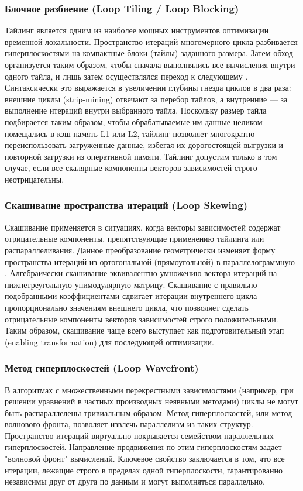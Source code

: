 \documentclass[14pt, russian]{scrartcl}
\begin{document}
\subsubsection{Блочное разбиение (Loop Tiling / Loop Blocking)}
Тайлинг является одним из наиболее мощных инструментов оптимизации временной локальности. Пространство итераций многомерного цикла разбивается гиперплоскостями на компактные блоки (тайлы) заданного размера. Затем обход организуется таким образом, чтобы сначала выполнялись все вычисления внутри одного тайла, и лишь затем осуществлялся переход к следующему \cite{wolfLam1991}. 
Синтаксически это выражается в увеличении глубины гнезда циклов в два раза: внешние циклы (strip-mining) отвечают за перебор тайлов, а внутренние --- за выполнение итераций внутри выбранного тайла. Поскольку размер тайла подбирается таким образом, чтобы обрабатываемые им данные целиком помещались в кэш-память L1 или L2, тайлинг позволяет многократно переиспользовать загруженные данные, избегая их дорогостоящей выгрузки и повторной загрузки из оперативной памяти. Тайлинг допустим только в том случае, если все скалярные компоненты векторов зависимостей строго неотрицательны.

\subsubsection{Скашивание пространства итераций (Loop Skewing)}
Скашивание применяется в ситуациях, когда векторы зависимостей содержат отрицательные компоненты, препятствующие применению тайлинга или распараллеливания. Данное преобразование геометрически изменяет форму пространства итераций из ортогональной (прямоугольной) в параллелограммную \cite{lamport1974}.
Алгебраически скашивание эквивалентно умножению вектора итераций на нижнетреугольную унимодулярную матрицу. Скашивание с правильно подобранными коэффициентами сдвигает итерации внутреннего цикла пропорционально значениям внешнего цикла, что позволяет сделать отрицательные компоненты векторов зависимостей строго положительными. Таким образом, скашивание чаще всего выступает как подготовительный этап (enabling transformation) для последующей оптимизации.

\subsubsection{Метод гиперплоскостей (Loop Wavefront)}
В алгоритмах с множественными перекрестными зависимостями (например, при решении уравнений в частных производных неявными методами) циклы не могут быть распараллелены тривиальным образом. Метод гиперплоскостей, или метод волнового фронта, позволяет извлечь параллелизм из таких структур. Пространство итераций виртуально покрывается семейством параллельных гиперплоскостей. Направление продвижения по этим гиперплоскостям задает "волновой фронт" вычислений. Ключевое свойство заключается в том, что все итерации, лежащие строго в пределах одной гиперплоскости, гарантированно независимы друг от друга по данным и могут выполняться параллельно.
\end{document}
